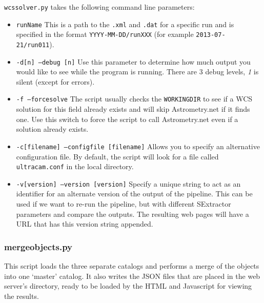 \texttt{wcssolver.py} takes the following command line parameters:
\begin{itemize}
  \item \texttt{runName} This is a path to the \texttt{.xml} and \texttt{.dat} for a specific run and is specified in the format \texttt{YYYY-MM-DD/runXXX}  (for example \texttt{2013-07-21/run011}).
  \item \texttt{-d[n] --debug [n]} Use this parameter to determine how much output you would like to see while the program is running. There are 3 debug levels, \emph{1} is silent (except for errors).
  \item \texttt{-f --forcesolve} The script usually checks the \texttt{WORKINGDIR} to see if a WCS solution for this field already exists and will skip Astrometry.net if it finds one. Use this switch to force the script to call Astrometry.net even if a solution already exists.
  \item \texttt{-c[filename] --configfile [filename]} Allows you to specify an alternative configuration file. By default, the script will look for a file called \texttt{ultracam.conf} in the local directory. 
  \item \texttt{-v[version] --version [version]} Specify a unique string to act as an identifier for an alternate version of the output of the pipeline. This can be used if we want to re-run the pipeline, but with different SExtractor parameters and compare the outputs. The resulting web pages will have a URL that has this version string appended.    
\end{itemize}

\subsubsection{mergeobjects.py}
This script loads the three separate catalogs and performs a merge of the objects into one `master' catalog. It also writes the JSON files that are placed in the web server's directory, ready to be loaded by the HTML and Javascript for viewing the results. 

